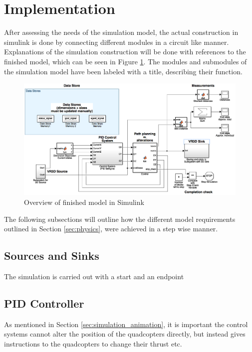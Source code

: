 \section{Implementation}
\label{sec:construction}

After assessing the needs of the simulation model, the actual construction in simulink is done by connecting different modules in a circuit like manner. Explanations of the simulation construction will be done with references to the finished model, which can be seen in Figure \ref{fig:model_overview}. The modules and submodules of the simulation model have been labeled with a title, describing their function. 

\begin{figure}[H]
  \centering
  \includegraphics[width=1\columnwidth]{figures/model_overview}
  \caption{\label{fig:model_overview}Overview of finished model in Simulink}
\end{figure}

The following subsections will outline how the different model requirements outlined in Section \ref{sec:physics}, were achieved in a step wise manner.

\subsection{Sources and Sinks}
The simulation is carried out with a start and an endpoint 

\subsection{PID Controller}
\label{sec:sim_pid}

As mentioned in Section \ref{sec:simulation_animation}, it is important the control systems cannot alter the position of the quadcopters directly, but instead gives instructions to the quadcopters to change their thrust etc. 

